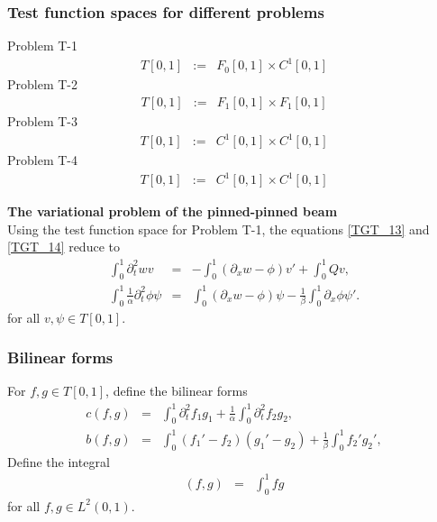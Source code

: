 \documentclass[../../main.tex]{subfiles}
\begin{document}
    \subsubsection{Test function spaces for different problems}\label{sssec:1D_Model:TestFunction}
    Problem T-1
    \begin{eqnarray*}
        T[0,1] &:=& F_0[0,1] \times C^1[0,1]
    \end{eqnarray*}
    Problem T-2
    \begin{eqnarray*}
        T[0,1] &:=& F_1[0,1] \times F_1[0,1]
    \end{eqnarray*}
    Problem T-3
    \begin{eqnarray*}
        T[0,1] &:=&  C^1[0,1]\times C^1[0,1]
    \end{eqnarray*}
    Problem T-4
    \begin{eqnarray*}
        T[0,1] &:=& C^1[0,1] \times C^1[0,1]
    \end{eqnarray*}

    \textbf{The variational problem of the pinned-pinned beam}\\

    Using the test function space for Problem T-1, the equations \eqref{TGT_13} and \eqref{TGT_14} reduce to
    \begin{eqnarray}
        \int_{0}^{1} \partial_{t}^{2} w v &=& -\int_{0}^{1}(\partial_x w - \phi) v' + \int_{0}^{1} Q v, \label{eq:1D_Model:ProblemT1V1}\\
        \int_{0}^{1}\frac{1}{\alpha} \partial_{t}^{2} \phi \psi &=&   \int_{0}^{1} (\partial_x w -\phi) \psi - \frac{1}{\beta} \int_{0}^{1}\partial_x \phi \psi'.\label{eq:1D_Model:ProblemT1V2}
    \end{eqnarray}
    for all $v, \psi \in T[0,1]$.

    \subsubsection{Bilinear forms}
    For $f,g \in T[0,1]$, define the bilinear forms
    \begin{eqnarray}
        c(f,g) & = & \int_0^1  \partial_t^2 f_1 g_1 + \frac{1}{\alpha}\int_0^1  \partial_t^2 f_2g_2, \label{eq:1D_Model:Bilinear} \\
        b(f,g) & = &   \int_0^1 (f_1'-f_2)(g_1' - g_2) + \frac{1}{\beta}\int_0^1 f_2' g_2', \label{eq:1D_Model:Bilinear_c}
    \end{eqnarray}
    Define the integral
    \begin{eqnarray}
    (f,g)
        &=& \int_{0}^1 fg \label{eq:1D_Model:Bilinear_int}
    \end{eqnarray} for all $f,g \in L^2(0,1).$\\
\end{document}
